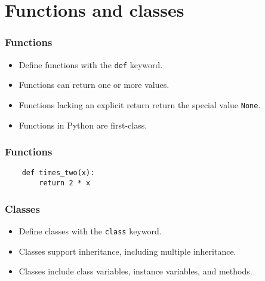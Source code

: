 \documentclass[10pt]{beamer}
\begin{document}
\section{Functions and classes}
\begin{frame}
	\frametitle{Functions}
	\begin{itemize}
		\item Define functions with the \texttt{def} keyword.
		\item Functions can return one or more values.
		\item Functions lacking an explicit return return the 
			special value \texttt{None}.
		\item Functions in Python are first-class.
	\end{itemize}
\end{frame}
\begin{frame}[fragile]
	\frametitle{Functions}

	\begin{verbatim}
    def times_two(x):
        return 2 * x
	\end{verbatim}
\end{frame}
\begin{frame}
	\frametitle{Classes}
	\begin{itemize}
		\item Define classes with the \texttt{class} keyword.
		\item Classes support inheritance, including multiple inheritance.
		\item Classes include class variables, instance variables, and
			methods.
	\end{itemize}
\end{frame}
\end{document}
